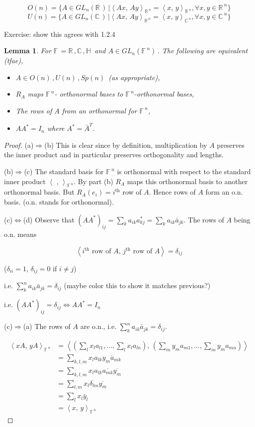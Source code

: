 \documentclass[12pt,a4paper]{article}
\newcommand{\rR}{\ensuremath{\mathbb{R}\,}}
\newcommand{\cC}{\ensuremath{\mathbb{C}\,}}
\newcommand{\hH}{\ensuremath{\mathbb{H}\,}}
\newcommand{\fF}{\ensuremath{\mathbb{F}\,}}
\newcommand{\glnr}{\ensuremath{GL_n(\rR)\,}}
\newcommand{\glnc}{\ensuremath{GL_n(\cC)\,}}
\newcommand{\glnf}{\ensuremath{GL_n(\fF^n)\,}}
\newcommand{\gon}{\ensuremath{O(n)\,}}
\newcommand{\gun}{\ensuremath{U(n)\,}}
\newcommand{\gspn}{\ensuremath{Sp(n)\,}}
\newcommand{\ra}{\ensuremath{\Rightarrow}}
\newcommand{\ipm}[2]{\ensuremath{\left\langle #1, \, #2 \right\rangle}}
\newtheorem{lemma}[thm]{Lemma}
\begin{document}
\[O(n)=\{A\in \glnr | \ipm{Ax}{Ay}_{\rR^{n}}=\ipm{x}{y}_{\rR^{n}}, \forall x,y \in \rR^n\}\]
\[U(n)=\{A\in \glnc | \ipm{Ax}{Ay}_{\rR^{n}}=\ipm{x}{y}_{\cC^{n}}, \forall x,y \in \cC^n\}\]

Exercise: show this agrees with 1.2.4

\begin{lemma}
For $\fF=\rR, \cC,\hH$ and $A\in \glnf$. The following are equivalent (tfae),

\begin{itemize}
\item[a)] $A \in \gon, \gun, \gspn$ (as appropriate),
\item[b)] $R_A$ maps $\fF^n$- orthonormal bases to $\fF^n$-orthonormal bases,
\item[c)] The rows of $A$ from an orthonormal for $\fF^n$,
\item[d)] $AA^*=I_n$ where $A^*=\bar{A}^T$.
\end{itemize}
\end{lemma}

\begin{proof}
(a)$\ra$(b) This is clear since by definition, multiplication by $A$ preserves the inner product and in particular preserves orthogonality and lengths.

(b)$\ra$(c) The standard basis for $\fF^n$ is orthonormal with respect to the standard inner product $\ipm{\,\,}{}_{\fF^n}$. By part (b) $R_A$ maps this orthonormal basis to another orthonormal basis. But $R_A(e_i)=i^{\text{th}}$ row of $A$. Hence rows of $A$ form an o.n. basis. (o.n. stands for orthonormal).

(c)$\iff$(d) Observe that $(AA^*)_{ij}=\sum\limits_k a_{ik}a^*_{kj}=\sum\limits_k a_{ik}\bar{a}_{jk}$. The rows of $A$ being o.n. means 

\[\ipm{i^{\text{th}}\text{ row of } A }{j^{\text{th}}\text{ row of } A }=\delta_{ij}\]

($\delta_{ii}=1$, $\delta_{ij}=0$ if $i\neq j$)

i.e. $\sum\limits_k^n a_{ik}\bar{a}_{jk}=\delta_{ij}$ (maybe color this to show it matches previous?)

i.e. $(AA^*)_{ij}=\delta_{ij} \iff AA^*=I_n$

(c)$\ra$(a) The rows of $A$ are o.n., i.e. $\sum\limits_k^n a_{ik}\bar{a}_{jk}=\delta_{ij}$.

\begin{align*}
\ipm{xA}{yA}_{\fF^n}&=\ipm{\left(\sum_l x_l a_{l1},\ldots, \sum_l x_l a_{ln}\right) }{\left(\sum_m y_m a_{m1},\ldots,\sum_m y_m a_{mn}\right)}\\
&=\sum_{k,l,m} x_l a_{lk} \overline{y_m a_{mk}}\\
&=\sum_{k,l,m} x_l a_{lk} \overline{a_{mk}}\overline{y_m }\\
&=\sum_{l,m} x_l\delta_{lm}\overline{y_m }\\
&= \sum_l x_l \bar{y}_l\\
&= \ipm{x}{y}_{\fF^n}
\end{align*}

\end{proof}
\end{document}
